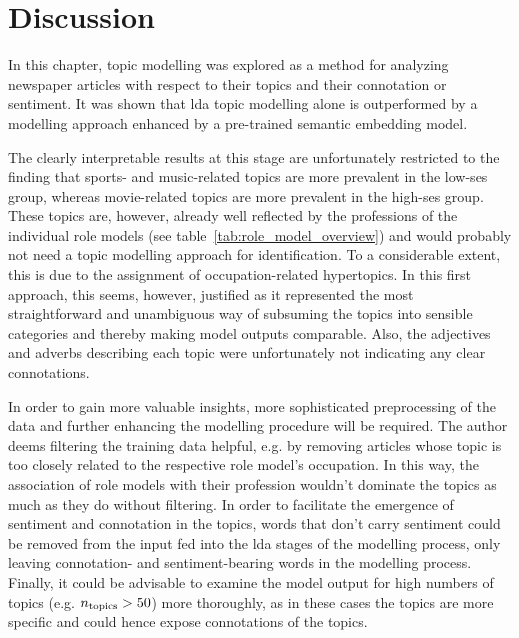 \section{Discussion}
In this chapter, topic modelling was explored as a method for analyzing newspaper articles with respect to their topics and their connotation or sentiment. It was shown that \gls{lda} topic modelling alone is outperformed by a modelling approach enhanced by a pre-trained semantic embedding model.

The clearly interpretable results at this stage are unfortunately restricted to the finding that sports- and music-related topics are more prevalent in the low-\gls{ses} group, whereas movie-related topics are more prevalent in the high-\gls{ses} group. These topics are, however, already well reflected by the professions of the individual role models (see table~\ref{tab:role_model_overview}) and would probably not need a topic modelling approach for identification. To a considerable extent, this is due to the assignment of occupation-related hypertopics. In this first approach, this seems, however, justified as it represented the most straightforward and unambiguous way of subsuming the topics into sensible categories and thereby making model outputs comparable. Also, the adjectives and adverbs describing each topic were unfortunately not indicating any clear connotations.

In order to gain more valuable insights, more sophisticated preprocessing of the data and further enhancing the modelling procedure will be required. The author deems filtering the training data helpful, e.g. by removing articles whose topic is too closely related to the respective role model's occupation. In this way, the association of role models with their profession wouldn't dominate the topics as much as they do without filtering. In order to facilitate the emergence of sentiment and connotation in the topics, words that don't carry sentiment could be removed from the input fed into the \gls{lda} stages of the modelling process, only leaving connotation- and  sentiment-bearing words in the modelling process. Finally, it could be advisable to examine the model output for high numbers of topics (e.g. $n_\text{topics}>50$) more thoroughly, as in these cases the topics are more specific and could hence expose connotations of the topics.

